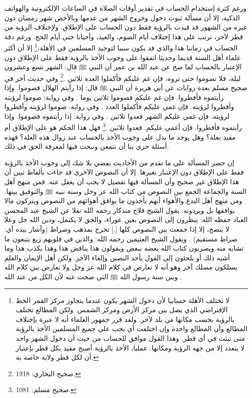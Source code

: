 ورغم كثرة إستخدام الحساب في تقدير أوقات الصلاة في الساعات الإلكترونية والهواتف الذكية، إلا أن مسألة ثبوت دخول وخروج الشهر من عدمها وبالأخص شهر رمضان دون غيره من الشهور قد قيدت بالرؤية فقط دون الحساب على الإطلاق. ولإختلاف الرؤية من قطر لآخر، ترتب على هذا إختلاف أيام الصوم، والعيد، وأحيانا حتى أيام الحج. ورغم دقة الحساب في زماننا هذا والذي قد يكون سببا لتوحيد المسلمين في الأهلة،\footnote{لا تختلف الأهلة حسابيا لأن دخول الشهر يكون عندما يتجاوز مركز القمر الخط الإفتراضي الذي يصل بين مركز الأرض ومركز الشمس. ولكن المطالع تختلف بالرؤية بحسب مكانها من بلد لآخر. ولقد قرر جمهور العلماء أنه لا عبرة بإختلاف المطالع وأن المطالع واحدة وإن اختلفت أي يجب على جميع المسلمين الأخذ بالرؤية متى تبثت في أي قطر. وهذا القول موافق للحساب من حيث أن دخول الشهر واحد لا يتعدد إلا من جهة الرؤية ومكانها. عمليا، الأخذ بالرؤية أصبح مقيد بكل قطر بإعتبار أن لكل قطر ولاية خاصة به.} إلا أن أكثر علماء أهل السنة قديما وحديثا اتفقوا على وجوب الأخذ بالرؤية فقط على الإطلاق دون الإعتبار بالحساب لما صح عن عبد الله بن عمر أن النبي ﷺ قال: الشهر تسع وعشرون ليلة، فلا تصوموا حتى تروه، فإن غم عليكم فأكملوا العدة ثلاثين \href{https://shamela.ws/book/1284/1257#p1}{\faExternalLink} \cite{bukhari}.\footnote{صحيح البخاري: 1918.} وفي حديث أخر في صحيح مسلم بعدة روايات عن أبي هريرة أن النبي ﷺ قال: إذا رأيتم الهلال فصوموا. وإذا رأيتموه فأفطروا. فإن غم عليكم فصوموا ثلاثين يوما \href{https://shamela.ws/book/1727/2446#p2}{\faExternalLink}. وفي رواية: صوموا لرؤيته وأفطروا لرؤيته. فإن غمي عليكم فأكملوا العدد \href{https://shamela.ws/book/1727/2447#p2}{\faExternalLink}. وفي رواية: صوموا لرؤيته وأفطروا لرؤيته. فإن غمي عليكم الشهر فعدوا ثلاثين \href{https://shamela.ws/book/1727/2448#p2}{\faExternalLink}. وفي رواية: إذا رأيتموه فصوموا. وإذا رأيتموه فأفطروا. فإن أغمي عليكم. فعدوا ثلاثين \href{https://shamela.ws/book/1727/2449#p2}{\faExternalLink} \cite{muslim}.\footnote{صحيح مسلم: 1081.} فهل هذا الحكم هو على الإطلاق أم مقيد بعلة؟ وهل يوجد ما يدل على وجوب الأخذ بالحساب عند زوال هذه العلة؟ فهذه أسئلة حري بنا أن نتمعن ونبحث فيها لمعرفة الحق في ذلك.

إن حصر المسألة على ما تقدم من الأحاديث يفضي بلا شك إلى وجوب الأخذ بالرؤية فقط على الإطلاق دون الإعتبار بغيرها. إلا أن النصوص الآخرى قد جاءت بألفاظ تبين أن هذا الإطلاق غير صحيح وأن المسألة فيها تفصيل لا يجب أن يغفل عنه. فمن منهج أهل السنة والجماعة الجمع بين النصوص من كتاب الله عز وجل وسنة نبيه ﷺ والتوفيق بينها. ومن منهج أهل البدع والأهواء أنهم يأخذون ما يوافق أهوائهم من النصوص ويتركون مالا يوافقها بل ويردونه. يقول الشيخ فلاح مندكار رحمه الله نقلا عن الشيخ عبد المحسن العباد حفظه الله: ينظرون إلى النصوص بعين عوراء، والحق لا يكتمل، ودين الله جل وعلا لا يتضح، إلا إذا جمعت بين النصوص كلها [.] تخرج بمذهب وصراط (وأشار بيده أي: صراط مستقيم) \href{https://www.youtube.com/watch?v=PEQsmhJX51w}{\faExternalLink}. ويقول الشيخ العثيمين رحمه الله: والذين في قلوبهم زيغ يتبعون ما تشابه منه ويضربون كتاب الله بعضه ببعض ويقولون هذا يناقض هذا وهذا يكذب هذا وما أشبه ذلك أو يلجئون إلى القول بأحد النصين وإلغاء الآخر. ولكن أهل الإيمان والعلم يسلكون مسلك آخر وهو أنه لا تعارض في كلام الله عز وجل ولا تعارض بين كلام الله وبين سنة رسول الله ﷺ التي صحت عنه لأن الكل من عند الله \href{https://www.youtube.com/watch?v=KvRTXkTmeew}{\faExternalLink}.


